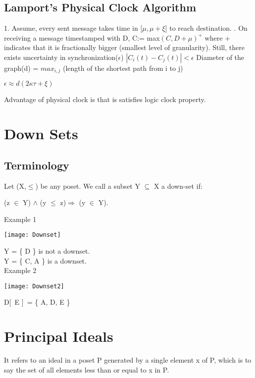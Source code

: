 \documentclass[twoside]{article}
\begin{document}
\subsection{Lamport's Physical Clock Algorithm}
1. Assume, every sent message takes time in [$\mu, \mu+\xi$] to reach destination.
. On receiving a message timestamped with D, C:= max$(C, D+\mu)^+$ where + indicates that it is fractionally bigger (smallest level of granularity).
Still, there exists uncertainty in synchronization($\epsilon$)
\newline
$|C_{i}(t) - C_{j}(t)| < \epsilon$  
\newline
Diameter of the graph(d) = $max_{i,j}$ (length of the shortest path from i to j)
\newline

$\boxed{\epsilon \approx d(2\kappa\tau + \xi)}$
\newline

Advantage of physical clock is that is satisfies logic clock property. 

\section{Down Sets}
\subsection{Terminology}
Let (X,$\leqslant$) be any poset. We call a subset Y $\subseteq$ X a down-set if:\\

\centerline{(z $\in$ Y) $\land$ (y $\leqslant$ z)$\Rightarrow$ (y $\in$ Y).}

Example 1\\
\begin{center}
\texttt{[image: Downset]}\\
\end{center}
Y = \{ D \} is not a downset.\\
Y = \{ C, A \} is a downset.\\
Example 2\\
\begin{center}
\texttt{[image: Downset2]}\\
\end{center}
D[\, E ]\, = \{ A, D, E \}

\section{Principal Ideals}
It refers to an ideal in a poset P generated by a single element x of P, which is to say the set of all elements less than or equal to x in P.
\end{document}
